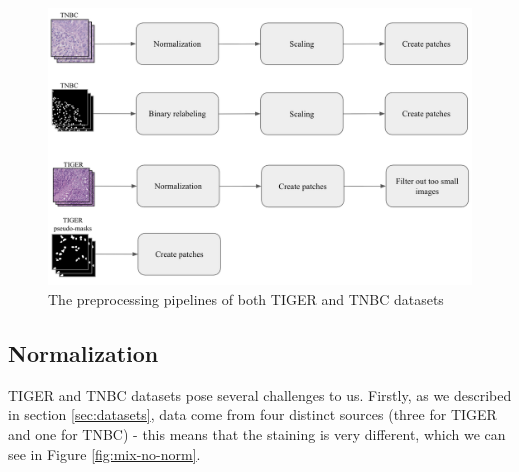 \begin{figure}[H]
\begin{centering}
\includegraphics[width=\textwidth]{assets/images/for_presentation/dg-preprocessing.png}
\par\end{centering}
\caption{The preprocessing pipelines of both TIGER and TNBC datasets
\label{fig:dg-preprocessing}}
\end{figure}

\subsection{Normalization} 
TIGER and TNBC datasets pose several challenges to us. Firstly, as we described in section \ref{sec:datasets}, data come from four distinct sources (three for TIGER and one for TNBC) - this means that the staining is very different, which we can see in Figure \ref{fig:mix-no-norm}.

